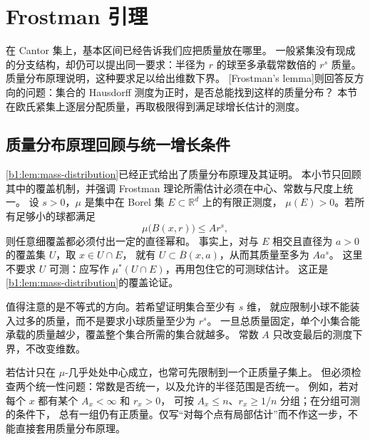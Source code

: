 \section{Frostman 引理}
\label{b1:sec:1504}

在 Cantor 集上，基本区间已经告诉我们应把质量放在哪里。
一般紧集没有现成的分支结构，却仍可以提出同一要求：半径为 \(r\) 的球至多承载常数倍的 \(r^s\) 质量。
质量分布原理说明，这种要求足以给出维数下界。
[Frostman's lemma]则回答反方向的问题：集合的 Hausdorff 测度为正时，是否总能找到这样的质量分布？
本节在欧氏紧集上逐层分配质量，再取极限得到满足球增长估计的测度。


\subsection{质量分布原理回顾与统一增长条件}
\label{b1:subsec:150401}

\cref{b1:lem:mass-distribution}已经正式给出了质量分布原理及其证明。
本小节只回顾其中的覆盖机制，并强调 Frostman 理论所需估计必须在中心、常数与尺度上统一。
设 \(s>0\)，\(\mu\) 是集中在 Borel 集 \(E\subset\mathbb R^d\) 上的有限正测度，
\(\mu(E)>0\)。若所有足够小的球都满足
\[
 \mu\bigl(B(x,r)\bigr)\leq A r^s,
\]
则任意细覆盖都必须付出一定的直径幂和。
事实上，对与 \(E\) 相交且直径为 \(a>0\) 的覆盖集 \(U\)，取 \(x\in U\cap E\)，
就有 \(U\subset\overline B(x,a)\)，从而其质量至多为 \(Aa^s\)。
这里不要求 \(U\) 可测：应写作 \(\mu^*(U\cap E)\)，再用包住它的可测球估计。
这正是\cref{b1:lem:mass-distribution}的覆盖论证。

\ProseParagraphBreak

值得注意的是不等式的方向。若希望证明集合至少有 \(s\) 维，
就应限制小球不能装入过多的质量，而不是要求小球质量至少为 \(r^s\)。
一旦总质量固定，单个小集合能承载的质量越少，覆盖整个集合所需的集合就越多。
常数 \(A\) 只改变最后的测度下界，不改变维数。

\ProseParagraphBreak

若估计只在 \(\mu\)-几乎处处中心成立，也常可先限制到一个正质量子集上。
但必须检查两个统一性问题：常数是否统一，以及允许的半径范围是否统一。
例如，若对每个 \(x\) 都有某个 \(A_x<\infty\) 和 \(r_x>0\)，
可按 \(A_x\leq n\)、\(r_x\geq1/n\) 分组；在分组可测的条件下，
总有一组仍有正质量。仅写“对每个点有局部估计”而不作这一步，不能直接套用质量分布原理。

